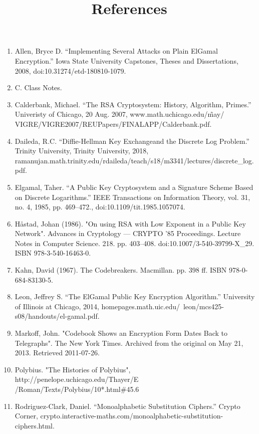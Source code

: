 \documentclass[12pt]{article}
\begin{document}
\newpage
\begin{center}
    \title{References}
\end{center}
\begin{enumerate}
    \item \label{iastate} Allen, Bryce D. “Implementing Several Attacks on Plain ElGamal Encryption.” Iowa State University Capstones, Theses and Dissertations, 2008, doi:10.31274/etd-180810-1079.
    \item \label{class}C. Class Notes.
    \item \label{chicago} Calderbank, Michael. “The RSA Cryptosystem:  History, Algorithm, Primes.” Univeristy of Chicago, 20 Aug. 2007, www.math.uchicago.edu/\~may/\\VIGRE/VIGRE2007/REUPapers/FINALAPP/Calderbank.pdf.
    \item \label{daileda} Daileda, R.C. “Diffie-Hellman Key Exchangeand the Discrete Log Problem.” Trinity University, Trinity University, 2018,\\ ramanujan.math.trinity.edu/rdaileda/teach/s18/m3341/lectures/discrete\_log.pdf.
    \item \label{gamal} Elgamal, Taher. “A Public Key Cryptosystem and a Signature Scheme Based on Discrete Logarithms.” IEEE Transactions on Information Theory, vol. 31, no. 4, 1985, pp. 469–472., doi:10.1109/tit.1985.1057074.
    \item \label{johan} Håstad, Johan (1986). "On using RSA with Low Exponent in a Public Key Network". Advances in Cryptology — CRYPTO '85 Proceedings. Lecture Notes in Computer Science. 218. pp. 403–408. doi:10.1007/3-540-39799-X\_29. ISBN 978-3-540-16463-0.
    \item \label{kahn} Kahn, David (1967). The Codebreakers. Macmillan. pp. 398 ff. ISBN 978-0-684-83130-5.
    \item \label{uicmath} Leon, Jeffrey S. “The ElGamal Public Key Encryption Algorithm.” University of Illinois at Chicago, 2014, homepages.math.uic.edu/~leon/mcs425-s08/handouts/el-gamal.pdf.
    \item \label{markoff} Markoff, John. "Codebook Shows an Encryption Form Dates Back to Telegraphs". The New York Times. Archived from the original on May 21, 2013. Retrieved 2011-07-26.
    \item \label{polybius} Polybius. "The Histories of Polybius", http://penelope.uchicago.edu/Thayer/E\\/Roman/Texts/Polybius/10*.html\#45.6
    \item \label{rodriguez}Rodriguez-Clark, Daniel. “Monoalphabetic Substitution Ciphers.” Crypto Corner, crypto.interactive-maths.com/monoalphabetic-substitution-ciphers.html.

\end{enumerate}
\end{document}
